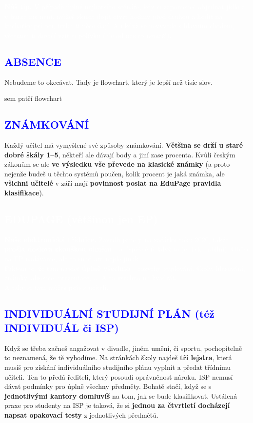 \documentclass{article}
\newcommand{\podnadpisf}[1]{
  \subsection*{\textcolor{blue}{#1}}
}
\begin{document}
\begin{bluebox}
  \textcolor{white}{\footnotesize
  \textbf{Náš tip.} V případě úplně nejhoršího scénáře, kdy si zapomeneš objednat jídlo a v burze nic není, můžeš zkusit dojít čtvrt hodiny před druhou a hodit na kuchařky psí oči, třeba ti něco dají. A i když se nevyvede s hlavním chodem, většinou ti dovolí vzít si polívku (ale od nás to nemáš!).}
\end{bluebox}

\pagebreak
\podnadpisf{ABSENCE}
Nebudeme to okecávat. Tady je flowchart, který je lepší než tisíc slov.

sem patří flowchart

\pagebreak

\podnadpisf{ZNÁMKOVÁNÍ}
Každý učitel má vymyšlené své způsoby známkování. \textbf{Většina se drží u staré dobré škály 1--5}, někteří ale dávají body a jiní zase procenta. Kvůli českým zákonům se ale \textbf{ve výsledku vše převede na klasické známky} (a proto nejenže budeš u těchto  systémů poučen, kolik procent je jaká známka, ale \textbf{všichni učitelé} v září mají \textbf{povinnost poslat na EduPage pravidla klasifikace}).

\begin{bluebox}
\textcolor{white}{\subsection*{EDUPAGE (většinou jen EP)}
\textbf{Naše elektronická třídnice.} Zavedli jsme ji na začátku roku 2020, takže \textbf{prošla doslova zkouškou ohněm} -- a úspěšně (i když to je diskutabilní). Občas na EP nadáváme, ale to snad ani
nejde jinak. \\
Faktem je, že tam najdeš \textbf{úplně všechno} -- rozvrhy, suplování, úkoly, hlasování, známky, absence, prezentace, ... A to všechno na kvadrát. \\
A taky si tam můžeš psát s učiteli.
}
\end{bluebox}

\podnadpisf{INDIVIDUÁLNÍ STUDIJNÍ PLÁN (též INDIVIDUÁL či ISP)}
Když se třeba začneš angažovat v divadle, jiném umění, či sportu, pochopitelně to neznamená, že tě vyhodíme. Na stránkách školy najdeš \textbf{tři lejstra}, která musíš pro získání individuálního studijního plánu vyplnit a předat třídnímu učiteli. Ten to předá řediteli, který posoudí oprávněnost nároku.
ISP nemusí dávat podmínky pro úplně všechny předměty. Bohatě stačí, když se
s \textbf{jednotlivými kantory domluvíš} na tom, jak se bude klasifikovat. Ustálená praxe pro studenty na ISP je taková, že si \textbf{jednou za čtvrtletí docházejí napsat opakovací testy} z jednotlivých předmětů.
\end{document}
